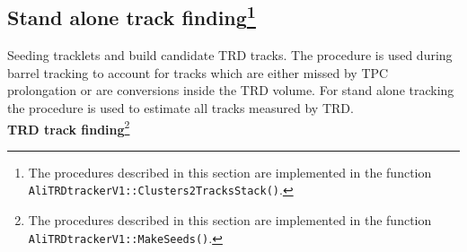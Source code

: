 \documentclass{alicetdr}
\begin{document}
\subsection[Stand alone track finding]{Stand alone track finding\footnote{The procedures 
described in this section are implemented in the function 
{\tt AliTRDtrackerV1::Clusters2TracksStack()}.}}\label{REC:Tracking:Clusters2TracksStack}

Seeding tracklets and build candidate TRD tracks. The procedure is used during 
barrel tracking to account for tracks which are either missed by TPC prolongation 
or are conversions inside the TRD volume. For stand alone tracking the procedure 
is used to estimate all tracks measured by TRD. 
\\

\noindent
{\bf TRD track finding}\footnote{The procedures described in this section 
are implemented in the function {\tt AliTRDtrackerV1::MakeSeeds()}.}
\\
\end{document}

